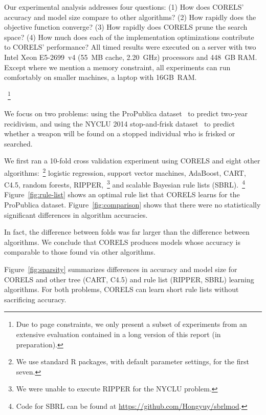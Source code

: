 
Our experimental analysis addresses four questions:
(1) How does CORELS' accuracy and model size compare to other algorithms?
(2) How rapidly does the objective function converge?
(3) How rapidly does CORELS prune the search space?
(4) How much does each of the implementation optimizations contribute to CORELS' performance?
%
All timed results were executed on a server with two Intel Xeon E5-2699~v4
(55~MB cache, 2.20~GHz) processors and 448~GB RAM.
%
Except where we mention a memory constraint, all experiments
can run comfortably on smaller machines, \eg a laptop with 16GB~RAM.\begin{kdd}
~\footnote{Due to page constraints, we only present a subset of experiments from
an extensive evaluation contained in a long version of this report (in preparation).}
\end{kdd}
%
We focus on two problems:
using the ProPublica dataset~\citep{LarsonMaKiAn16} to predict two-year recidivism,
and using the NYCLU 2014 stop-and-frisk dataset~\citep{nyclu:2014} to predict
whether a weapon will be found on a stopped individual who is frisked or searched.

We first ran a 10-fold cross validation experiment using CORELS
and eight other algorithms:~\footnote{We use standard R packages, with default
parameter settings, for the first seven.}
logistic regression, support vector machines, AdaBoost, CART, C4.5, random forests,
RIPPER,~\footnote{We were unable to execute RIPPER for the NYCLU problem.}
and scalable Bayesian rule lists (SBRL).~\footnote{Code for SBRL can be found at
\url{https://github.com/Hongyuy/sbrlmod}.}
%
Figure~\ref{fig:rule-list} shows an  optimal rule list that CORELS learns
for the ProPublica dataset.
%
Figure~\ref{fig:comparison} shows that there were no statistically significant
differences in algorithm accuracies.
\begin{arxiv}
In fact, the difference between folds was far larger than the difference
between algorithms.
We conclude that CORELS produces models whose accuracy is comparable
to those found via other algorithms.

\end{arxiv}
%
Figure~\ref{fig:sparsity} summarizes differences in accuracy and model size
for CORELS and other tree (CART, C4.5) and rule list (RIPPER, SBRL) learning algorithms.
%
For both problems, CORELS can learn short rule lists without sacrificing accuracy.


